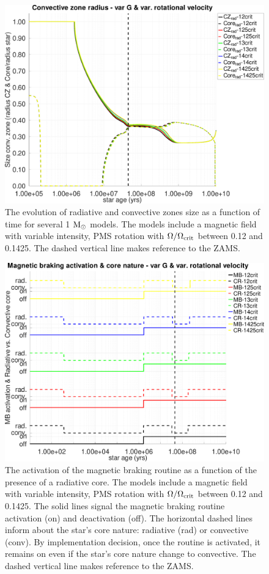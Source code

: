 \documentclass[fleqn,usenatbib]{mnras}
\begin{document}
\begin{ceqn}
\begin{figure}
	\includegraphics[clip,width=\columnwidth]{figures/paper2/cz_var_vel_var_g3.pdf}
    \caption{The evolution of radiative and convective zones size as a function of time for several 1 $\mathrm{M}_\odot$ models. The models include a magnetic field with variable intensity, PMS rotation with $\Omega / \Omega_{\mathrm{crit}}$ between 0.12 and 0.1425. The dashed vertical line makes reference to the ZAMS.}
    \label{fig:cz_var_vel_var_g3}
\end{figure}

\begin{figure}
	\includegraphics[clip,width=\columnwidth]{figures/paper2/mb_act_var_vel_g3.pdf}
    \caption{The activation of the magnetic braking routine as a function of the presence of a radiative core. The models include a magnetic field with variable intensity, PMS rotation with $\Omega / \Omega_{\mathrm{crit}}$ between 0.12 and 0.1425. The solid lines signal the magnetic braking routine activation (on) and deactivation (off). The horizontal dashed lines inform about the star's core nature: radiative (rad) or convective (conv). By implementation decision, once the routine is activated, it remains on even if the star's core nature change to convective. The dashed vertical line makes reference to the ZAMS.}
    \label{fig:mb_act_var_vel_g3}
\end{figure}



\end{ceqn}
\end{document}
